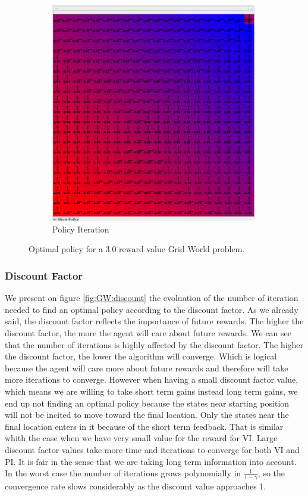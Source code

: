 \documentclass[10pt, twocolumn]{article}
\begin{document}
\begin{figure}[]
\begin{subfigure}[t]{0.24\textwidth}
						\includegraphics[width=\textwidth]{../graphics/GridWorld_3.0_pi_reward.png}
						\caption{Policy Iteration}
						\label{fig:GW:reward:PI}
					\end{subfigure}
					\caption{Optimal policy for a 3.0 reward value Grid World problem.}
					\label{fig:GW:reward:comparison}
				\end{figure}
			\subsubsection*{Discount Factor}
				We present on figure \ref{fig:GW:discount} the evoluation of the number of iteration needed to find an optimal policy according to the discount factor. As we already said, the discount factor reflects the importance of future rewards. The higher the discount factor, the more the agent will care about future rewards. We can see that the number of iterations is highly affected by the discount factor. The higher the discount factor, the lower the algorithm will converge. Which is logical because the agent will care more about future rewards and therefore will take more iterations to converge. However when having a small discount factor value, which means we are willing to take short term gains instead long term gains, we end up not finding an optimal policy because the states near starting position will not be incited to move toward the final location. Only the states near the final location enters in it because of the short term feedback. That is similar whith the case when we have very small value for the reward for VI. Large discount factor values take more time and iterations to converge for both VI and PI. It is fair in the sense that we are taking long term information into account. In the worst case the number of iterations grows polynomially in $\frac{1}{1- \gamma}$, so the convergence rate slows considerably as the discount value approaches 1.
\end{document}
